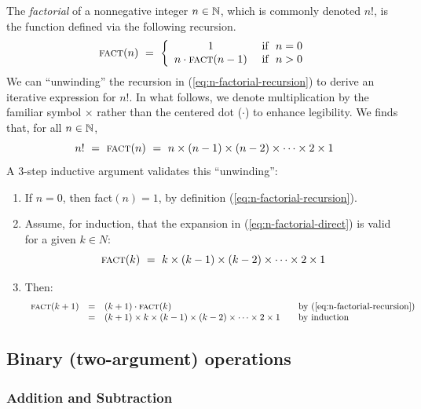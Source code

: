 The {\it factorial} of a nonnegative integer $n \in \mathbb{N}$, which is
commonly denoted $n!$,
is the function defined via the following recursion.
\begin{equation}
\label{eq:n-factorial-recursion}
\mbox{\sc fact}(n) \ = \ \left\{
\begin{array}{cl}
1 & \mbox{  if } \ n=0 \\
n \cdot \mbox{\sc fact}(n-1) & \mbox{  if } \ n>0
\end{array}
\right.
\end{equation}
We can ``unwinding'' the recursion in (\ref{eq:n-factorial-recursion})
to derive an iterative expression for $n!$.  In what follows, we
denote multiplication by the familiar symbol $\times$ rather than the
centered dot ($\cdot$) to enhance legibility.  We finds that, for all
$n \in \mathbb{N}$,
\begin{equation}
\label{eq:n-factorial-direct}
n! \ = \ \mbox{\sc fact}(n) \ = \ 
n \times (n-1) \times (n-2) \times \cdots \times 2 \times 1
\end{equation} 
A $3$-step inductive argument validates this ``unwinding'':
\begin{enumerate}
\item
If $n =0$, then {\sc fact}$(n) = 1$, by definition
(\ref{eq:n-factorial-recursion}).
\item
Assume, for induction, that the expansion in
(\ref{eq:n-factorial-direct}) is valid for a given $k \in N$:
\[ \mbox{\sc fact}(k) \ = \ k \times (k-1) \times (k-2) \times \cdots
\times 2 \times 1 \] 
\item
Then:
\[
\begin{array}{lclll}
\mbox{\sc fact}(k+1) & = & (k+1) \cdot \mbox{\sc fact}(k)
  & & \mbox{by (\ref{eq:n-factorial-recursion})} \\
  & = &
(k+1) \times k \times (k-1) \times (k-2) \times \cdots \times 2 \times 1
  & & \mbox{by induction}
\end{array}
\]
\end{enumerate}


\subsection{Binary (two-argument) operations}
\label{sec:binary-operators}

\subsubsection{Addition and Subtraction}

